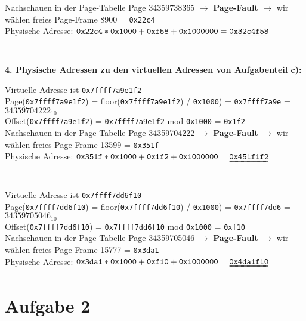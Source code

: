 \documentclass{ti2}
\begin{document}
Nachschauen in der Page-Tabelle Page 34359738365 $\rightarrow$ \textbf{Page-Fault} $\rightarrow$ wir wählen freies Page-Frame 8900 = \texttt{0x22c4}\\

Physische Adresse: $\texttt{0x22c4} * \texttt{0x1000} + \texttt{0xf58} + \texttt{0x1000000} = \uuline{\texttt{0x32c4f58}}$\\
\\
\\

\textbf{4. Physische Adressen zu den virtuellen Adressen von Aufgabenteil c):}

Virtuelle Adresse ist \texttt{0x7ffff7a9e1f2}\\

Page(\texttt{0x7ffff7a9e1f2}) = floor(\texttt{0x7ffff7a9e1f2}) / \texttt{0x1000}) = \texttt{0x7ffff7a9e} = $34359704222_{10}$\\
Offset(\texttt{0x7ffff7a9e1f2}) = \texttt{0x7ffff7a9e1f2} mod \texttt{0x1000} = \texttt{0x1f2}\\

Nachschauen in der Page-Tabelle Page 34359704222 $\rightarrow$ \textbf{Page-Fault} $\rightarrow$ wir wählen freies Page-Frame 13599 = \texttt{0x351f}\\

Physische Adresse: $\texttt{0x351f} * \texttt{0x1000} + \texttt{0x1f2} + \texttt{0x1000000} = \uuline{\texttt{0x451f1f2}}$\\
\\
\\

Virtuelle Adresse ist \texttt{0x7ffff7dd6f10}\\

Page(\texttt{0x7ffff7dd6f10}) = floor(\texttt{0x7ffff7dd6f10}) / \texttt{0x1000}) = \texttt{0x7ffff7dd6} = $34359705046_{10}$\\
Offset(\texttt{0x7ffff7dd6f10}) = \texttt{0x7ffff7dd6f10} mod \texttt{0x1000} = \texttt{0xf10}\\

Nachschauen in der Page-Tabelle Page 34359705046 $\rightarrow$ \textbf{Page-Fault} $\rightarrow$ wir wählen freies Page-Frame 15777 = \texttt{0x3da1}\\

Physische Adresse: $\texttt{0x3da1} * \texttt{0x1000} + \texttt{0xf10} + \texttt{0x1000000} = \uuline{\texttt{0x4da1f10}}$\\


\section*{Aufgabe 2}
\end{document}
